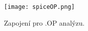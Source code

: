 \begin{figure}[h!]
    \centering
    \texttt{[image: spiceOP.png]}
    \caption{Zapojení pro .OP analýzu.}
    \label{fig:spiceOP.png}
\end{figure}